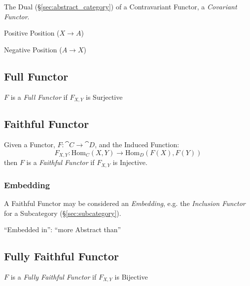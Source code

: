 The Dual (\S\ref{sec:abstract_category}) of a Contravariant
Functor, a \emph{Covariant Functor}.

Positive Position ($X \rightarrow A$)

Negative Position ($A \rightarrow X$)



\subsection{Full Functor}\label{sec:full_functor}

$F$ is a \emph{Full Functor} if $F_{X,Y}$ is Surjective



\subsection{Faithful Functor}\label{sec:faithful_functor}

Given a Functor, $F : \cat{C} \rightarrow \cat{D}$, and the
Induced Function:
\[
  F_{X,Y} : \mathrm{Hom}_C(X,Y) \rightarrow \mathrm{Hom}_D(F(X),F(Y))
\]
then $F$ is a \emph{Faithful Functor} if $F_{X,Y}$ is Injective.



\subsubsection{Embedding}\label{sec:category_embedding}

A Faithful Functor may be considered an \emph{Embedding}, e.g. the
\emph{Inclusion Functor} for a Subcategory
(\S\ref{sec:subcategory}).

``Embedded in'': ``more Abstract than''



\subsection{Fully Faithful Functor}\label{sec:fully_faithful}

$F$ is a \emph{Fully Faithful Functor} if $F_{X,Y}$ is Bijective

